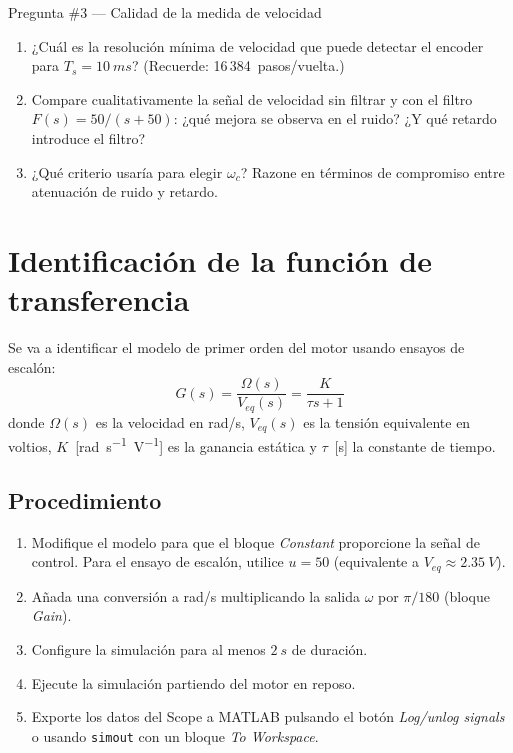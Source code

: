 \documentclass[12pt,a4paper]{article}
\begin{document}
\begin{pregunta}{Pregunta \#3 — Calidad de la medida de velocidad}
  \begin{enumerate}[label=\alph*)]
    \item ¿Cuál es la resolución mínima de velocidad que puede detectar el encoder
          para $T_s = \SI{10}{ms}$? (Recuerde: 16\,384~pasos/vuelta.)
    \item Compare cualitativamente la señal de velocidad sin filtrar y con el filtro
          $F(s)=50/(s+50)$: ¿qué mejora se observa en el ruido? ¿Y qué retardo
          introduce el filtro?
    \item ¿Qué criterio usaría para elegir $\omega_c$? Razone en términos de
          compromiso entre atenuación de ruido y retardo.
  \end{enumerate}
\end{pregunta}

\section{Identificación de la función de transferencia}

Se va a identificar el modelo de primer orden del motor usando ensayos de escalón:
\begin{equation}
  G(s) = \frac{\Omega(s)}{V_{eq}(s)} = \frac{K}{\tau s + 1}
  \label{eq:tf}
\end{equation}
donde $\Omega(s)$ es la velocidad en rad/s, $V_{eq}(s)$ es la tensión equivalente
en voltios, $K$~[\si{rad.s^{-1}.V^{-1}}] es la ganancia estática y $\tau$~[\si{s}]
la constante de tiempo.

\subsection{Procedimiento}

\begin{enumerate}
  \item Modifique el modelo para que el bloque \emph{Constant} proporcione la
        señal de control. Para el ensayo de escalón, utilice $u = 50$
        (equivalente a $V_{eq} \approx \SI{2.35}{V}$).
  \item Añada una conversión a rad/s multiplicando la salida $\omega$ por
        $\pi/180$ (bloque \emph{Gain}).
  \item Configure la simulación para al menos $\SI{2}{s}$ de duración.
  \item Ejecute la simulación partiendo del motor en reposo.
  \item Exporte los datos del Scope a MATLAB pulsando el botón
        \emph{Log/unlog signals} o usando \texttt{simout} con un bloque
        \emph{To Workspace}.
\end{enumerate}
\end{document}
